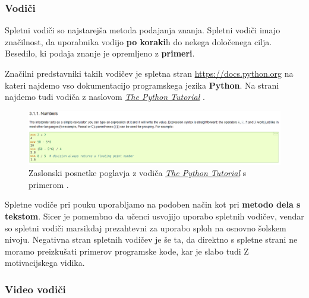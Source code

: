 
\subsubsection{Vodiči}

Spletni vodiči so najstarejša metoda podajanja znanja. Spletni vodiči
imajo značilnost, da uporabnika vodijo \textbf{po koraki}h do nekega
določenega cilja. Besedilo, ki podaja znanje je opremljeno z
\textbf{primeri}. \cite{wiki:tutorials}

Značilni predstavniki takih vodičev je spletna stran
\url{https://docs.python.org} na kateri najdemo vso dokumentacijo
programskega jezika \textbf{Python}. Na strani najdemo tudi vodiča z
naslovom \emph{\href{https://docs.python.org/3/tutorial/index.html}{The
  Python Tutorial}} \cite{web:TPythonTut The}.

\begin{figure}[h!]
    \includegraphics [width=1\linewidth, keepaspectratio =
    1] {./images/sc_web/tPyTut_01.png}
    \caption{Zaslonski posnetke poglavja z vodiča
      \emph{\href{https://docs.python.org/3/tutorial/index.html}{The
          Python Tutorial}} s primerom \cite{web:TPythonTut}.}
    \label{fig:scr:web:tPyTut}
\end{figure}

Spletne vodiče pri pouku uporabljamo na podoben način kot pri
\textbf{metodo dela s tekstom}. Sicer je pomembno da učenci usvojijo
uporabo spletnih vodičev, vendar so spletni vodiči marsikdaj
prezahtevni za uporabo sploh na osnovno šolskem nivoju. Negativna
stran spletnih vodičev je še ta, da direktno s spletne strani ne
moramo preizkušati primerov programske kode, kar je slabo tudi Z
motivacijskega vidika.

\subsubsection{Video vodiči}
\label{sec:video_vodici}


